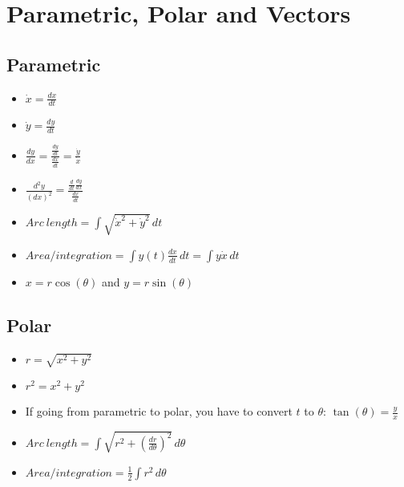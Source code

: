 \section{\color{Gray}Parametric, Polar and Vectors}
  \begin{multicols}{2}
  \subsection{\color{BrickRed}Parametric}
  \begin{itemize}
    \item \( \dot{x}=\frac{dx}{dt}\)\\
    \item \( \dot{y}=\frac{dy}{dt}\)\\
    \item
      \(\frac{dy}{dx}=\frac{\frac{dy}{dt}}{\frac{dx}{dt}}=\frac{\dot{y}}{\dot{x}}\) 
    \item
      \( \frac{d^2y}{\left(dx\right)^2} = \frac{\frac{d}{dt}\frac{dy}{dx}}{\frac{dx}{dt}} \)\\
    \item \(Arc ~ length = \int\sqrt{\dot{x}^2+\dot{y}^2} \, dt\)\\
    \item \(Area/integration = \int y(t) \frac{dx}{dt} \, dt = \int y \dot{x} \, dt \)\\
    \item \(x=r\cos(\theta)\) and \(y=r\sin(\theta)\)\\
  \end{itemize}
  \columnbreak
  \subsection{\color{BrickRed}Polar}
  \begin{itemize}
    \item \(r=\sqrt{x^2+y^2}\)\\
    \item \( r^2=x^2+y^2 \)\\
    \item If going from parametric to polar, you have to convert
      \(t\) to \(\theta\): \(\tan(\theta)=\frac{y}{x}\)\\
    \item \(Arc ~ length = \int \sqrt{r^2+\left( \frac{dr}{d\theta}
      \right)^2} \, d\theta\)
    \item \(Area/integration = \frac{1}{2} \int r^2 \, d\theta \)\\
  \end{itemize}
  \end{multicols}
